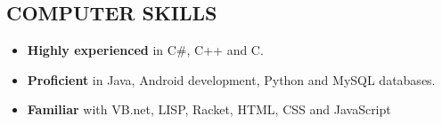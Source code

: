 
     \subsection*{COMPUTER SKILLS}
    \begin{itemize}
    \item \textbf{Highly experienced} in C\#, C++ and C.\\
    \item \textbf{Proficient} in Java, Android development, Python and MySQL databases.\\
    \item \textbf{Familiar} with VB.net, LISP, Racket, HTML, CSS and JavaScript\\
  	\end{itemize}